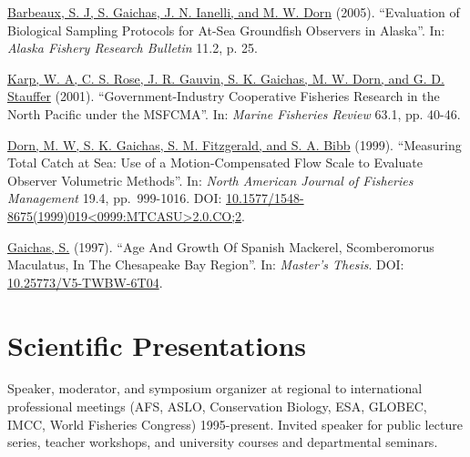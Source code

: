 \documentclass[11pt, a4paper]{awesome-cv}
\begin{document}
\protect\hyperlink{cite-barbeaux_evaluation_2005}{Barbeaux, S. J, S. Gaichas,
J. N. Ianelli, and M. W. Dorn} (2005).
``Evaluation of Biological Sampling Protocols for At-Sea Groundfish
Observers in Alaska''. In: \emph{Alaska Fishery Research Bulletin} 11.2, p.
25.

\protect\hyperlink{cite-karp_government-industry_2001}{Karp, W. A, C. S. Rose,
J. R. Gauvin, S. K. Gaichas, M. W. Dorn, and G. D.
Stauffer} (2001).
``Government-Industry Cooperative Fisheries Research in the North
Pacific under the MSFCMA''. In: \emph{Marine Fisheries Review} 63.1, pp.
40-46.

\protect\hyperlink{cite-dorn_measuring_1999}{Dorn, M. W, S. K. Gaichas, S. M.
Fitzgerald, and S. A. Bibb} (1999).
``Measuring Total Catch at Sea: Use of a Motion-Compensated Flow Scale
to Evaluate Observer Volumetric Methods''. In: \emph{North American Journal
of Fisheries Management} 19.4, pp.~999-1016. DOI:
\href{https://doi.org/10.1577\%2F1548-8675\%281999\%29019\%3C0999\%3AMTCASU\%3E2.0.CO\%3B2}{10.1577/1548-8675(1999)019\textless0999:MTCASU\textgreater2.0.CO;2}.

\protect\hyperlink{cite-gaichas_age_1997}{Gaichas, S.}
(1997). ``Age And Growth Of Spanish Mackerel, Scomberomorus Maculatus,
In The Chesapeake Bay Region''. In: \emph{Master's Thesis}. DOI:
\href{https://doi.org/10.25773\%2FV5-TWBW-6T04}{10.25773/V5-TWBW-6T04}.

\hypertarget{scientific-presentations}{%
\section{Scientific Presentations}\label{scientific-presentations}}

Speaker, moderator, and symposium organizer at regional to international professional meetings (AFS, ASLO, Conservation Biology, ESA, GLOBEC, IMCC, World Fisheries Congress) 1995-present. Invited speaker for public lecture series, teacher workshops, and university courses and departmental seminars.
\end{document}
